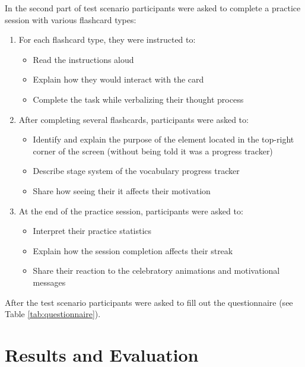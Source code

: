 In the second part of test scenario participants were asked to complete a practice session with various flashcard types:
\begin{enumerate}
    \item For each flashcard type, they were instructed to:
    \begin{itemize}
        \item Read the instructions aloud
        \item Explain how they would interact with the card
        \item Complete the task while verbalizing their thought process
    \end{itemize}

    \item After completing several flashcards, participants were asked to:
    \begin{itemize}
        \item Identify and explain the purpose of the element located in the top-right corner of the screen (without being told it was a progress tracker)
        \item Describe stage system of the vocabulary progress tracker
        \item Share how seeing their it affects their motivation
    \end{itemize}

    \item At the end of the practice session, participants were asked to:
    \begin{itemize}
        \item Interpret their practice statistics
        \item Explain how the session completion affects their streak
        \item Share their reaction to the celebratory animations and motivational messages
    \end{itemize}
\end{enumerate}

After the test scenario participants were asked to fill out the questionnaire (see Table \ref{tab:questionnaire}).

\section{Results and Evaluation}

